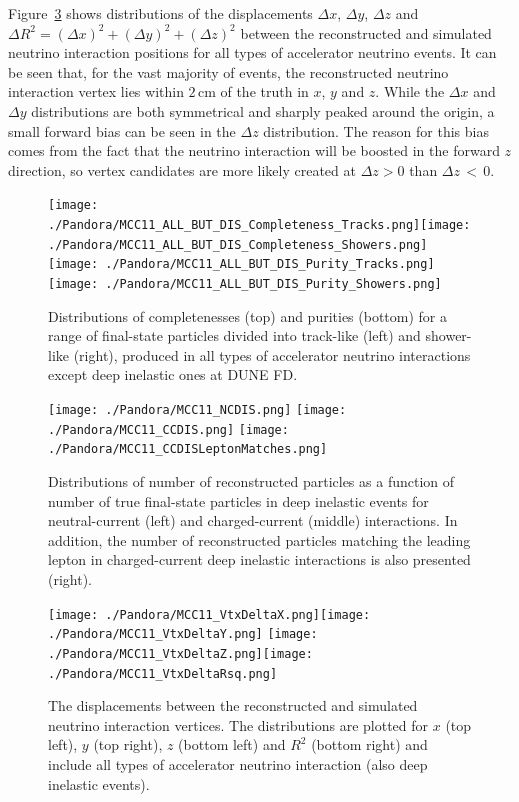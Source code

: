 Figure~\ref{pandora_vertex_resolution} shows distributions of the displacements $\Delta x$, $\Delta y$, $\Delta z$ and $\Delta R^{2} = (\Delta x)^2 + (\Delta y)^2 + (\Delta z)^2$ between the reconstructed and simulated neutrino interaction positions for all types of accelerator neutrino events. It can be seen that, for the vast majority of events, the reconstructed neutrino interaction vertex lies within $2$\,cm of the  truth in $x$, $y$ and $z$. While the $\Delta x$ and $\Delta y$ distributions are both symmetrical and sharply peaked around the origin, a small forward bias can be seen in the $\Delta z$ distribution. The reason for this bias comes from the fact that the neutrino interaction will be boosted in the forward $z$ direction, so vertex candidates are more likely created at $\Delta z>0$ than $\Delta z\,<\,0$.  

\begin{figure}[!ht]
\centering
\texttt{[image: ./Pandora/MCC11\_ALL\_BUT\_DIS\_Completeness\_Tracks.png]}\texttt{[image: ./Pandora/MCC11\_ALL\_BUT\_DIS\_Completeness\_Showers.png]}
\texttt{[image: ./Pandora/MCC11\_ALL\_BUT\_DIS\_Purity\_Tracks.png]}\texttt{[image: ./Pandora/MCC11\_ALL\_BUT\_DIS\_Purity\_Showers.png]}
\caption[Completeness (top) and purities (bottom) for a range of final-state track-like  and shower-like particles]{Distributions of completenesses (top) and purities (bottom) for a range of final-state particles divided into track-like (left) and shower-like (right), produced in all types of accelerator neutrino interactions except deep inelastic ones at DUNE FD. }
\label{pandora_completeness_purity}
\end{figure}

\begin{figure}[!ht]
\centering
\texttt{[image: ./Pandora/MCC11\_NCDIS.png]}
\texttt{[image: ./Pandora/MCC11\_CCDIS.png]}
\texttt{[image: ./Pandora/MCC11\_CCDISLeptonMatches.png]}
\caption[Number of reconstructed particles per number of true final-state particles,  and ]{Distributions of number of reconstructed particles as a function of number of true final-state particles in deep inelastic events for neutral-current (left) and charged-current (middle) interactions. In addition, the number of reconstructed particles matching the leading lepton in charged-current deep inelastic interactions is also presented (right).}
\label{pandora_dis}
\end{figure}


\begin{figure}[!ht]
\centering
\texttt{[image: ./Pandora/MCC11\_VtxDeltaX.png]}\texttt{[image: ./Pandora/MCC11\_VtxDeltaY.png]}
\texttt{[image: ./Pandora/MCC11\_VtxDeltaZ.png]}\texttt{[image: ./Pandora/MCC11\_VtxDeltaRsq.png]}
\caption[Displacements between reconstructed and simulated $\nu$ interaction vertices]{The displacements between the reconstructed and simulated neutrino interaction vertices. The distributions are plotted for $x$ (top left), $y$ (top right), $z$ (bottom left) and $R^2$ (bottom right) and include all types of accelerator neutrino interaction (also deep inelastic events).}
\label{pandora_vertex_resolution}
\end{figure}

